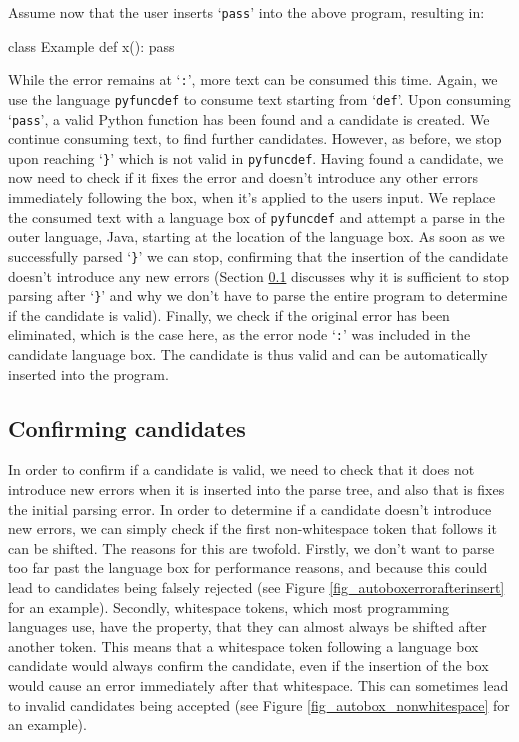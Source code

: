 \documentclass[sigplan,screen]{acmart}\settopmatter{printfolios=true,printccs=false,printacmref=false}
\newcommand{\qtt}[1]{`\texttt{#1}'\xspace}
\begin{document}
Assume now that the user inserts \qtt{pass} into the above program, resulting in:

\begin{minipage}{\linewidth}
\begin{lstdefault}[language=Java]
  class Example {
      def x():
          pass
  }
\end{lstdefault}
\end{minipage}
\vspace{1em}

While the error remains at \qtt{:}, more text can be consumed this time. Again,
we use the language \texttt{pyfuncdef} to consume text starting from \qtt{def}.
Upon consuming \qtt{pass}, a valid Python function has been found and a
candidate is created. We continue consuming text, to find further candidates.
However, as before, we stop upon reaching \qtt{\}} which is not valid in
\texttt{pyfuncdef}. Having found a candidate, we now need to check if it fixes
the error and doesn't introduce any other errors immediately following the box,
when it's applied to the users input. We replace the consumed text with a
language box of \texttt{pyfuncdef} and attempt a parse in the outer language,
Java, starting at the location of the language box.
As soon as we successfully parsed \qtt{\}} we can stop,
confirming that the insertion of the candidate doesn't introduce
any new errors (Section \ref{sec:parse_after_lbox} discusses why it is
sufficient to stop parsing after \qtt{\}} and why we don't have to parse the
entire program to determine if the candidate is valid). Finally, we check if
the original error has been eliminated, which is the case here, as the error
node \qtt{:} was included in the candidate language box. The candidate is thus
valid and can be automatically inserted into the program.

\subsection{Confirming candidates}
\label{sec:parse_after_lbox}

In order to confirm if a candidate is valid, we need to
check that it does not introduce new errors when it is inserted into the parse
tree, and also that is fixes the initial parsing error. In order to determine if a
candidate doesn't introduce new errors, we can simply check if the first
non-whitespace token that follows it can be shifted.  The reasons for this are
twofold. Firstly, we don't want to parse too far past the language box for
performance reasons, and because this could lead to candidates being falsely
rejected (see Figure \ref{fig_autoboxerrorafterinsert} for an example).
Secondly, whitespace tokens, which most programming languages use, have the
property, that they can almost always be shifted after another token. This
means that a whitespace token following a language box candidate would always
confirm the candidate, even if the insertion of the box would cause an error
immediately after that whitespace. This can sometimes lead to invalid
candidates being accepted (see Figure \ref{fig_autobox_nonwhitespace} for an
example).
\end{document}
